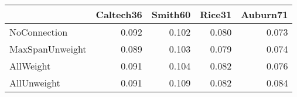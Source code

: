 \begin{tabular}{lrrrr}
\toprule
{} & Caltech36 & Smith60 & Rice31 & Auburn71 \\
\midrule
NoConnection    &     0.092 &   0.102 &  0.080 &    0.073 \\
MaxSpanUnweight &     0.089 &   0.103 &  0.079 &    0.074 \\
AllWeight       &     0.091 &   0.104 &  0.082 &    0.076 \\
AllUnweight     &     0.091 &   0.109 &  0.082 &    0.084 \\
\bottomrule
\end{tabular}
